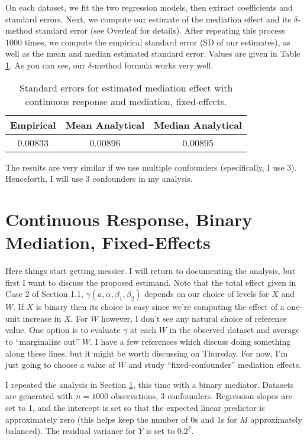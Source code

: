 \documentclass{article}
\begin{document}
On each dataset, we fit the two regression models, then extract coefficients and standard errors. Next, we compute our estimate of the mediation effect and its $\delta$-method standard error (see Overleaf for details). After repeating this process $1000$ times, we compute the empirical standard error (SD of our estimates), as well as the mean and median estimated standard error. Values are given in Table \ref{tab:SEs_cont_fix}. As you can see, our $\delta$-method formula works very well.

\begin{table}
    \centering
    \begin{tabular}{|c|c|c|}
        \hline
        Empirical & Mean Analytical & Median Analytical\\
        \hline
        0.00833 & 0.00896 & 0.00895\\
        \hline
    \end{tabular}
    \caption{Standard errors for estimated mediation effect with continuous response and mediation, fixed-effects.}
    \label{tab:SEs_cont_fix}
\end{table}

The results are very similar if we use multiple confounders (specifically, I use 3). Henceforth, I will use 3 confounders in my analysis.

\section{Continuous Response, Binary Mediation, Fixed-Effects}
\label{sec:cont_bin_fix}

Here things start getting messier. I will return to documenting the analysis, but first I want to discuss the proposed estimand. Note that the total effect given in Case 2 of Section 1.1, $\gamma(a, \alpha, \beta_1, \beta_2)$ depends on our choice of levels for $X$ and $W$. If $X$ is binary then its choice is easy since we're computing the effect of a one-unit increase in $X$. For $W$ however, I don't see any natural choice of reference value. One option is to evaluate $\gamma$ at each $W$ in the observed dataset and average to ``marginalize out'' $W$. I have a few references which discuss doing something along these lines, but it might be worth discussing on Thursday. For now, I'm just going to choose a value of $W$ and study ``fixed-confounder'' mediation effects.


I repeated the analysis in Section \ref{tab:SEs_cont_fix}, this time with a binary mediator. Datasets are generated with $n=1000$ observations, 3 confounders. Regression slopes are set to 1, and the intercept is set so that the expected linear predictor is approximately zero (this helps keep the number of 0s and 1s for $M$ approximately balanced). The residual variance for $Y$ is set to $0.2^2$.
\end{document}
